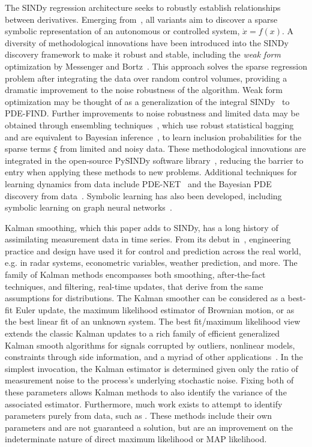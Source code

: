 \documentclass{article}
\begin{document}
The SINDy regression architecture seeks to robustly establish relationships between derivatives.
Emerging from~\cite{Brunton2016,brunton2022data}, all variants aim to discover a sparse symbolic representation of an autonomous or controlled system, $\dot x = f(x)$.
A diversity of methodological innovations have been introduced into the SINDy discovery framework to make it robust and stable, including the \emph{weak form} optimization by Messenger and Bortz~\cite{messenger2021bweak,messenger2021weak}.
This approach solves the sparse regression problem after integrating the data over random control volumes, providing a dramatic improvement to the noise robustness of the algorithm.
Weak form optimization may be thought of as a generalization of the integral SINDy~\cite{Schaeffer2017} to PDE-FIND.
Further improvements to noise robustness and limited data may be obtained through ensembling techniques~\cite{Fasel2022}, which use robust statistical bagging and are equivalent to Bayesian inference~\cite{gao2022bayesian,gao2023convergence}, to learn inclusion probabilities for the sparse terms $\xi$ from limited and noisy data.
These methodological innovations are integrated in the open-source PySINDy software library~\cite{Kaptanoglu2022}, reducing the barrier to entry when applying these methods to new problems.  Additional techniques for learning dynamics from data include PDE-NET~\cite{Long2019,Long2018} and the Bayesian PDE discovery from data~\cite{atkinson2020bayesian}.
Symbolic learning has also been developed, including symbolic learning on graph neural networks~\cite{cranmer2019learning,cranmer2020discovering,sanchez2020learning}.

Kalman smoothing, which this paper adds to SINDy, has a long history of assimilating measurement data in time series.
From its debut in~\cite{kalman, KalBuc}, engineering practice and design have used it for control and prediction across the real world, e.g. in radar systems, econometric variables, weather prediction, and more.
The family of Kalman methods encompasses both smoothing, after-the-fact techniques, and filtering, real-time updates, that derive from the same assumptions for distributions.
The Kalman smoother can be considered as a best-fit Euler update, the maximum likelihood estimator of Brownian motion, or as the best linear fit of an unknown system.
The best fit/maximum likelihood view extends the classic Kalman updates to a rich family of efficient generalized Kalman smooth algorithms for signals corrupted by outliers, nonlinear models, constraints through side information, and a myriad of other applications~\cite{aravkin2017generalized}.
In the simplest invocation, the Kalman estimator is determined given only the ratio of measurement noise to the process's underlying stochastic noise.
Fixing both of these parameters allows Kalman methods to also identify the variance of the associated estimator.
Furthermore, much work exists to attempt to identify parameters purely from data, such as \cite{Barratt2020,VanBreugel2020}.
These methods include their own parameters and are not guaranteed a solution, but are an improvement on the indeterminate nature of direct maximum likelihood or MAP likelihood.
\end{document}
